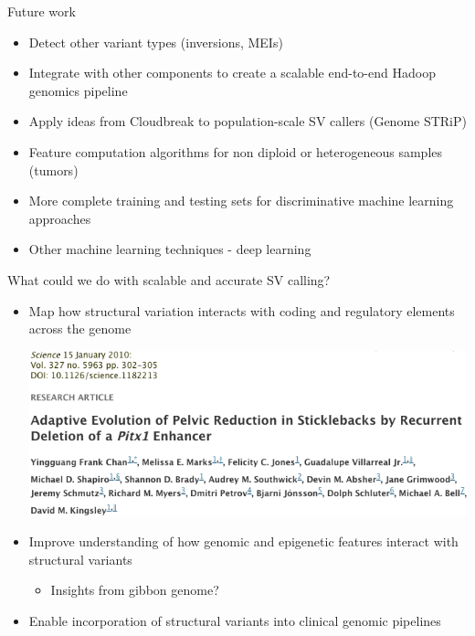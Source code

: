 \documentclass{beamer}
\begin{document}
\begin{frame}{Future work}
  \begin{itemize}
    \item Detect other variant types (inversions, MEIs)
    \item Integrate with other components to create a scalable end-to-end Hadoop genomics pipeline
    \item Apply ideas from Cloudbreak to population-scale SV callers (Genome STRiP)
    \item Feature computation algorithms for non diploid or heterogeneous samples (tumors)
    \item More complete training and testing sets for discriminative machine learning approaches
    \item Other machine learning techniques - deep learning
  \end{itemize}
\end{frame}

\begin{frame}{What could we do with scalable and accurate SV calling?}
  \begin{itemize}
    \item Map how structural variation interacts with coding and 
      regulatory elements across the genome
      \begin{center}
      \includegraphics[width=.6\textwidth]{stickleback_paper.png}
      \end{center}
    \item Improve understanding of how genomic and epigenetic features interact
      with structural variants
      \begin{itemize}
        \item Insights from gibbon genome?
      \end{itemize}
    \item Enable incorporation of structural variants into clinical genomic pipelines
  \end{itemize}
\end{frame}
\end{document}
